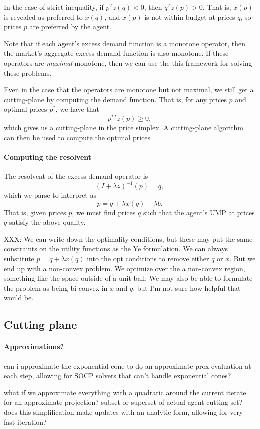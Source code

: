 \documentclass[12pt]{article}
\begin{document}
In the case of strict inequality, if $p^T z(q) < 0$, then $q^T z(p) > 0$.
That is, $x(p)$ is revealed as preferred to $x(q)$, and $x(p)$ is not within
budget at prices $q$, so prices $p$ are preferred by the agent.

Note that if each agent's excess demand function is a monotone operator, then
the market's aggregate excess demand function is also monotone. If these
operators are \emph{maximal} monotone, then we can use the this framework for
solving these problems.

Even in the case that the operators are monotone but not maximal, we still get
a cutting-plane by computing the demand function. That is, for any prices $p$
and optimal prices $p^*$, we have that
\[
p^{*T} z(p) \geq 0,
\]
which gives us a cutting-plane in the price simplex.
A cutting-plane algorithm can then be used to compute the optimal prices

\paragraph{Computing the resolvent}
The resolvent of the excess demand operator is
\[
(I + \lambda z)^{-1}(p) = q,
\]
which we parse to interpret as
\[
p = q + \lambda x(q) - \lambda b.
\]
That is, given prices $p$, we must find prices $q$ such that the agent's UMP
at prices $q$ satisfy the above quality.

XXX: We can write down the optimality conditions, but these may put the same
constraints on the utility functions as the Ye formulation. We can always
substitute $p = q + \lambda x(q)$ into the opt conditions to remove either
$q$ or $x$. But we end up with a non-convex problem. We optimize over the a
non-convex region, something like the space outside of a unit ball.
We may also be able to formulate the problem as being bi-convex in $x$ and $q$,
but I'm not sure how helpful that would be.

\subsection{Cutting plane}
\paragraph{Approximations?}
can i approximate the exponential cone to do an approximate prox evaluation
at each step, allowing for SOCP solvers that can't handle exponential cones?

what if we approximate everything with a quadratic around the current iterate
for an approximate projection? subset or superset of actual agent cutting set?
does this simplification make updates with an analytic form, allowing for very
fast iteration?



\newpage


\end{document}
